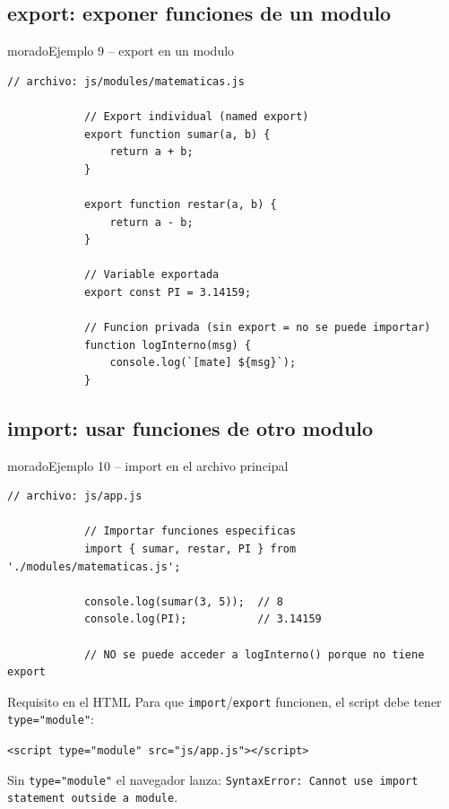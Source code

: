 \documentclass[11pt,a4paper]{article}
\begin{document}
	\subsection{export: exponer funciones de un modulo}
	
	\begin{cajacodigo}{morado}{Ejemplo 9 -- export en un modulo}
		\begin{lstlisting}[style=codejs]
			// archivo: js/modules/matematicas.js
			
			// Export individual (named export)
			export function sumar(a, b) {
				return a + b;
			}
			
			export function restar(a, b) {
				return a - b;
			}
			
			// Variable exportada
			export const PI = 3.14159;
			
			// Funcion privada (sin export = no se puede importar)
			function logInterno(msg) {
				console.log(`[mate] ${msg}`);
			}
		\end{lstlisting}
	\end{cajacodigo}
	
	\subsection{import: usar funciones de otro modulo}
	
	\begin{cajacodigo}{morado}{Ejemplo 10 -- import en el archivo principal}
		\begin{lstlisting}[style=codejs]
			// archivo: js/app.js
			
			// Importar funciones especificas
			import { sumar, restar, PI } from './modules/matematicas.js';
			
			console.log(sumar(3, 5));  // 8
			console.log(PI);           // 3.14159
			
			// NO se puede acceder a logInterno() porque no tiene export
		\end{lstlisting}
	\end{cajacodigo}
	
	\begin{cajaconcepto}{Requisito en el HTML}
		Para que \texttt{import}/\texttt{export} funcionen, el script debe tener \texttt{type="module"}:
		
		\texttt{<script type="module" src="js/app.js"></script>}
		
		Sin \texttt{type="module"} el navegador lanza: \texttt{SyntaxError: Cannot use import statement outside a module}.
	\end{cajaconcepto}
	
\end{document}
